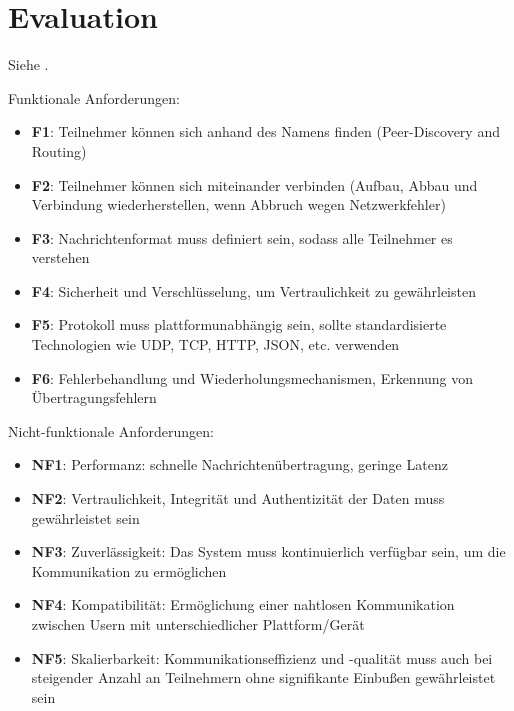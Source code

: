 \chapter{Evaluation}
\label{chap:evaluation}

Siehe .

Funktionale Anforderungen:

\begin{itemize}
    \item \textbf{F1}: Teilnehmer können sich anhand des Namens finden (Peer-Discovery and Routing)
    \item \textbf{F2}: Teilnehmer können sich miteinander verbinden (Aufbau, Abbau und Verbindung wiederherstellen, wenn Abbruch wegen Netzwerkfehler)
    \item \textbf{F3}: Nachrichtenformat muss definiert sein, sodass alle Teilnehmer es verstehen
    \item \textbf{F4}: Sicherheit und Verschlüsselung, um Vertraulichkeit zu gewährleisten
    \item \textbf{F5}: Protokoll muss plattformunabhängig sein, sollte standardisierte Technologien wie UDP, TCP, HTTP, JSON, etc. verwenden
    \item \textbf{F6}: Fehlerbehandlung und Wiederholungsmechanismen, Erkennung von Übertragungsfehlern
\end{itemize}

Nicht-funktionale Anforderungen:

\begin{itemize}
    \item \textbf{NF1}: Performanz: schnelle Nachrichtenübertragung, geringe Latenz
    \item \textbf{NF2}: Vertraulichkeit, Integrität und Authentizität der Daten muss gewährleistet sein
    \item \textbf{NF3}: Zuverlässigkeit: Das System muss kontinuierlich verfügbar sein, um die Kommunikation zu ermöglichen
    \item \textbf{NF4}: Kompatibilität: Ermöglichung einer nahtlosen Kommunikation zwischen Usern mit unterschiedlicher Plattform/Gerät
    \item \textbf{NF5}: Skalierbarkeit: Kommunikationseffizienz und -qualität muss auch bei steigender Anzahl an Teilnehmern ohne signifikante Einbußen gewährleistet sein
\end{itemize}




